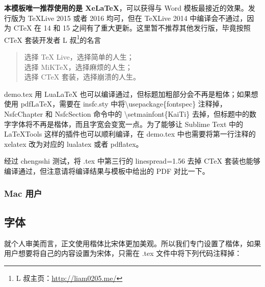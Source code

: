 \documentclass[a4paper,zihao=-4]{article}
\newcommand{\setmainfont}[1]{}
\begin{document}
\begin{CJK*}{UTF8}{gbsn}
\textbf{本模板唯一推荐使用的是 XeLaTeX}，可以获得与 Word 模板最接近的效果。发行版为 TeXLive 2015 或者 2016 均可，但在 TeXLive 2014 中编译会不通过，因为 CTeX 在 14 和 15 之间有了重大更新。这里暂不推荐其他发行版，毕竟按照 CTeX 套装开发者 L 叔\footnote{L 叔主页：\href{http://liam0205.me/}{http://liam0205.me/}}的名言
\begin{quote}
	选择 TeX Live，选择简单的人生；\\
	选择 MiKTeX，选择麻烦的人生；\\
	选择 CTeX 套装，选择崩溃的人生。
\end{quote}

demo.tex 用 LuaLaTeX 也可以编译通过，但标题加粗部分会不再是粗体；如果想使用 pdfLaTeX，需要在 insfc.sty 中将\textbackslash usepackage\{fontspec\} 注释掉，NsfcChapter 和 NsfcSection 命令中的 \textbackslash setmainfont\{KaiTi\} 去掉，但标题中的数字字体将不再是楷体，而且字宽会变宽一点。为了能够让 Sublime Text 中的 LaTeXTools 这样的插件也可以顺利编译，在 demo.tex 中也需要将第一行注释的 xelatex 改为对应的 lualatex 或者 pdflatex。

经过 chengsshi 测试，将 .tex 中第三行的 linespread=1.56 去掉 CTeX 套装也能够编译通过，但注意请将编译结果与模板中给出的 PDF 对比一下。

\subsubsection{Mac 用户}


\subsection{字体}
就个人审美而言，正文使用楷体比宋体更加美观。所以我们专门设置了楷体，如果用户想要将自己的内容设置为宋体，只需在 .tex 文件中将下列代码注释掉：


\end{CJK*}
\end{document}
